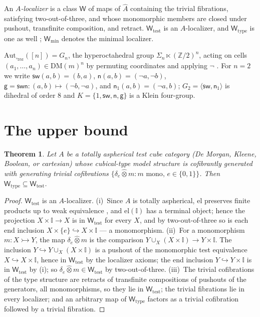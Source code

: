 \documentclass[11pt]{amsart}
\newtheorem{thm}{Theorem}[section]
\theoremstyle{definition}
\newcommand{\I}{\mathbb{I}}
\newcommand{\cube}{\square_{\mathrm{DM}}}
\newcommand{\el}{\mathrm{el}}
\newcommand{\DM}{\mathrm{DM}}
\newcommand{\Wtest}{\mathsf{W}_{\mathrm{test}}}
\newcommand{\Wtype}{\mathsf{W}_{\mathrm{type}}}
\newcommand{\Wmin}{\mathsf{W}_{\mathrm{min}}}
\newcommand{\sw}{\mathsf{sw}}
\newcommand{\nb}{\mathsf{n}}
\newcommand{\gtw}{\mathsf{g}}
\newcommand{\Kl}{K}
\begin{document}
An \emph{$A$-localizer} \cite[\S1.4]{Cisinski} is a class $\mathsf
W$ of maps of $\widehat A$ containing the trivial fibrations,
satisfying two-out-of-three, and whose monomorphic members are
closed under pushout, transfinite composition, and retract.
$\Wtest$ is an $A$-localizer, and $\Wtype$ is one as well
\cite{PaperL}; $\Wmin$ denotes the minimal localizer.

$\mathrm{Aut}_{\cube}([n]) = G_n$, the hyperoctahedral group
$\Sigma_n \ltimes (\mathbb{Z}/2)^n$, acting on cells
$(a_1, \dots, a_n) \in \DM(m)^n$ by permuting coordinates and
applying $\neg$ \cite{PaperL}.  For $n = 2$ we write
$\sw(a,b) = (b,a)$, $\nb(a,b) = (\neg a, \neg b)$,
$\gtw = \sw\nb : (a,b) \mapsto (\neg b, \neg a)$, and
$\nb_1(a,b) = (\neg a, b)$; $G_2 = \langle \sw, \nb_1\rangle$ is
dihedral of order $8$ and $\Kl = \{1, \sw, \nb, \gtw\}$ is a Klein
four-group.

\section{The upper bound}
\label{sec:upper}

\begin{thm}
  \label{thm:upper}
  Let $A$ be a totally aspherical test cube category (De Morgan,
  Kleene, Boolean, or cartesian) whose cubical-type model structure
  is cofibrantly generated with generating trivial cofibrations
  $\{\delta_e \mathbin{\hat\otimes} m : m \text{ mono},\,
  e \in \{0,1\}\}$.  Then $\Wtype \subseteq \Wtest$.
\end{thm}

\begin{proof}
  $\Wtest$ is an $A$-localizer.  (i)~Since $A$ is totally
  aspherical, $\el$ preserves finite products up to weak
  equivalence \cite[\S1.6]{Cisinski}, and $\el(\I)$ has a terminal
  object; hence the projection $X \times \I \to X$ is in $\Wtest$
  for every $X$, and by two-out-of-three so is each end inclusion
  $X \times \{e\} \hookrightarrow X \times \I$ --- a monomorphism.
  (ii)~For a monomorphism $m : X \rightarrowtail Y$, the map
  $\delta_e \mathbin{\hat\otimes} m$ is the comparison
  $Y \cup_X (X \times \I) \to Y \times \I$.  The inclusion
  $Y \hookrightarrow Y \cup_X (X \times \I)$ is a pushout of the
  monomorphic test equivalence $X \hookrightarrow X \times \I$,
  hence in $\Wtest$ by the localizer axioms; the end inclusion
  $Y \hookrightarrow Y \times \I$ is in $\Wtest$ by (i); so
  $\delta_e \mathbin{\hat\otimes} m \in \Wtest$ by
  two-out-of-three.  (iii)~The trivial cofibrations of the type
  structure are retracts of transfinite compositions of pushouts of
  the generators, all monomorphisms, so they lie in $\Wtest$; the
  trivial fibrations lie in every localizer; and an arbitrary map
  of $\Wtype$ factors as a trivial cofibration followed by a
  trivial fibration.
\end{proof}
\end{document}
